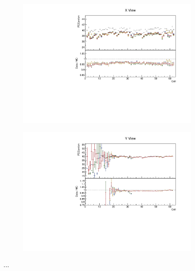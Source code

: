 \documentclass[12pt,a4paper]{article}
\begin{document}
\begin{figure}[h!]
\begin{subfigure}{0.5\textwidth}
  \end{subfigure}
  \begin{subfigure}{0.5\textwidth}
    \includegraphics[width=\linewidth]{essentialsec_tb/pecorrcm_cell_x.pdf}
  \end{subfigure}
  \begin{subfigure}{0.5\textwidth}
    \includegraphics[width=\linewidth]{essentialsec_tb/pecorrcm_cell_y.pdf}
  \end{subfigure}
  \caption{...}
  \label{figAbsCalibCell1}
\end{figure}
\end{document}
